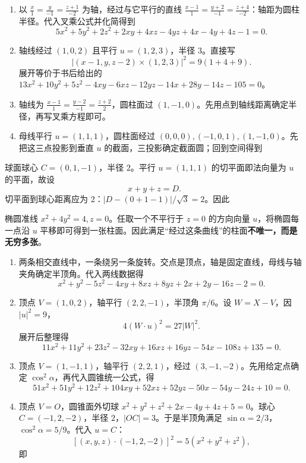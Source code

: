 \begin{enumerate}[label=(\arabic*)]
\item 以 $\frac{x}{1}=\frac{y}{-1}=\frac{z+1}{-2}$ 为轴，经过与它平行的直线 $\frac{x-1}{1}=\frac{y+2}{-1}=\frac{z+4}{-2}$：轴距为圆柱半径。代入叉乘公式并化简得到
\[5x^2+5y^2+2z^2+2xy+4xz-4yz+4x-4y+4z-1=0.\]
\item 轴线经过 $(1,0,2)$ 且平行 $u=(1,2,3)$，半径 $3$。直接写
\[|(x-1,y,z-2)\times(1,2,3)|^2=9(1+4+9).\]
展开等价于书后给出的 $13x^2+10y^2+5z^2-4xy-6xz-12yz-14x+28y-14z-105=0$。
\item 轴线为 $\frac{x-1}{1}=\frac{y-2}{-1}=\frac{z+2}{2}$，圆柱面过 $(1,-1,0)$。先用点到轴线距离确定半径，再写叉乘方程即可。
\item 母线平行 $u=(1,1,1)$，圆柱面经过 $(0,0,0),(-1,0,1),(1,-1,0)$。先把这三点投影到垂直 $u$ 的截面，三投影确定截面圆；回到空间得到
\end{enumerate}

球面球心 $C=(0,1,-1)$，半径 $2$。平行 $u=(1,1,1)$ 的切平面即法向量为 $u$ 的平面，故设
\[x+y+z=D.\]
切平面到球心距离应为 $2$：$|D-(0+1-1)|/\sqrt3=2$。因此

椭圆准线 $x^2+4y^2=4,z=0$。任取一个不平行于 $z=0$ 的方向向量 $u$，将椭圆每一点沿 $u$ 平移即可得到一张柱面。因此满足“经过这条曲线”的柱面\textbf{不唯一，而是无穷多张}。

\begin{enumerate}[label=(\arabic*)]
\item 两条相交直线中，一条绕另一条旋转。交点是顶点，轴是固定直线，母线与轴夹角确定半顶角。代入两线数据得
\[x^2+y^2-5z^2-4xy+8xz+8yz+2x+2y-16z-2=0.\]
\item 顶点 $V=(1,0,2)$，轴平行 $(2,2,-1)$，半顶角 $\pi/6$。设 $W=X-V$，因 $|u|^2=9$，
\[4(W\cdot u)^2=27|W|^2.\]
展开后整理得
\[11x^2+11y^2+23z^2-32xy+16xz+16yz-54x-108z+135=0.\]
\item 顶点 $V=(1,-1,1)$，轴平行 $(2,2,1)$，经过 $(3,-1,-2)$。先用给定点确定 $\cos^2\alpha$，再代入圆锥统一公式，得
\[51x^2+51y^2+12z^2+104xy+52xz+52yz-50x-54y-24z+10=0.\]
\item 顶点 $V=O$，圆锥面外切球 $x^2+y^2+z^2+2x-4y+4z+5=0$。球心 $C=(-1,2,-2)$，半径 $2$，$|OC|=3$。于是半顶角满足 $\sin\alpha=2/3$，\(\cos^2\alpha=5/9\)。代入 $u=C$：
\[[(x,y,z)\cdot(-1,2,-2)]^2=5(x^2+y^2+z^2),\]
即
\end{enumerate}

